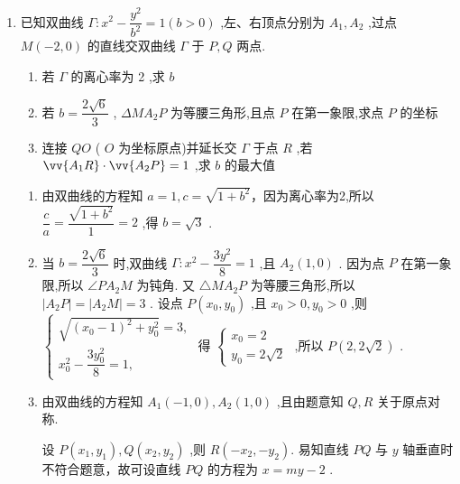 \begin{enumerate}
\begin{enumerate}
    \item 已知双曲线 $\Gamma  : {x}^{2} - \dfrac{{y}^{2}}{{b}^{2}} = 1\left( {b > 0}\right)$ ,左、右顶点分别为 ${A}_{1},{A}_{2}$ ,过点 $M\left( {-2,0}\right)$ 的直线交双曲线 $\Gamma$ 于 $P,Q$ 两点.
    \begin{enumerate}
        \item 若 $\Gamma$ 的离心率为 2 ,求 $b$
        \item 若 $b = \dfrac{2\sqrt{6}}{3}$ , ${\Delta M}{A}_{2}P$ 为等腰三角形,且点 $P$ 在第一象限,求点 $P$ 的坐标
        \item 连接 ${QO}$ ( $O$ 为坐标原点)并延长交 $\Gamma$ 于点 $R$ ,若 $\vv{{A}_{1}R} \cdot  \vv{{A}_{2}P} = 1$ ,求 $b$ 的最大值
    \end{enumerate}
    \begin{jieda}
        \begin{enumerate}
            \item 由双曲线的方程知 $a = 1,c = \sqrt{1 + {b}^{2}}$，因为离心率为2,所以 $\dfrac{c}{a} = \dfrac{\sqrt{1 + {b}^{2}}}{1} = 2$ ,得 $b = \sqrt{3}$ .
            \item 当 $b = \dfrac{2\sqrt{6}}{3}$ 时,双曲线 $\Gamma  : {x}^{2} - \dfrac{3{y}^{2}}{8} = 1$ ,且 ${A}_{2}\left( {1,0}\right)$ .
            因为点 $P$ 在第一象限,所以 $\angle P{A}_{2}M$ 为钝角.
            又 ${\triangle M}{A}_{2}P$ 为等腰三角形,所以 $\left| {{A}_{2}P}\right|  = \left| {{A}_{2}M}\right|  = 3$ .
            设点 $P\left( {{x}_{0},{y}_{0}}\right)$ ,且 ${x}_{0} > 0,{y}_{0} > 0$ ,则 $\left\{  \begin{matrix} \sqrt{{\left( {x}_{0} - 1\right) }^{2} + {y}_{0}^{2}} = 3, \\  {x}_{0}^{2} - \dfrac{3{y}_{0}^{2}}{8} = 1, \end{matrix}\right.$
            得 $\left\{  \begin{matrix} {x}_{0} = 2 \\  {y}_{0} = 2\sqrt{2} \end{matrix}\right.$ ,所以 $P\left( {2,2\sqrt{2}}\right)$ .
            
            \item 由双曲线的方程知 ${A}_{1}\left( {-1,0}\right) ,{A}_{2}\left( {1,0}\right)$ ,且由题意知 $Q,R$ 关于原点对称.
            
            设 $P\left( {{x}_{1},{y}_{1}}\right) ,Q\left( {{x}_{2},{y}_{2}}\right)$ ,则 $R\left( {-{x}_{2}, - {y}_{2}}\right)$. 易知直线 ${PQ}$ 与 $y$ 轴垂直时不符合题意，故可设直线 ${PQ}$ 的方程为 $x = {my} - 2$ .


\end{enumerate}
\end{jieda}
\end{enumerate}
\end{enumerate}
